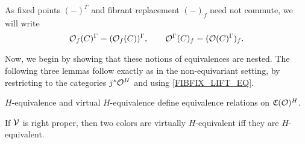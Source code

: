 \documentclass[a4paper,10pt
,draft
]{article}%
\newcommand{\I}{\mathbb I}
\newcommand{\J}{\mathbb J}
\renewcommand{\1}{\eta}%
\begin{document}
\begin{notation}
      As fixed points $(-)^\Gamma$ and fibrant replacement $(-)_f$ need not commute, we will write
      \begin{equation}
            \mathcal{O}_f(C)^\Gamma = (\mathcal{O}_f(C))^\Gamma,
            \qquad
            \mathcal{O}^\Gamma(C)_f = (\mathcal{O}(C)^{\Gamma})_f.
      \end{equation}
\end{notation}


Now, we begin by showing that these notions of equivalences are nested.
The following three lemmas follow exactly as in the non-equivariant setting,
by restricting to the categories $j^{\**}\O^H$ and using \eqref{FIBFIX_LIFT_EQ}.

\begin{lemma}
      \label{CAV_4.10_LEM}
      $H$-equivalence and virtual $H$-equivalence define equivalence relations on $\mathfrak C(\mathcal{O})^H$.
\end{lemma}


        
        
        

\begin{lemma}
      \label{RIGHTPROPER_LEM}
      If $\mathcal V$ is right proper, then two colors are virtually $H$-equivalent iff they are $H$-equivalent. 
\end{lemma}
\end{document}
